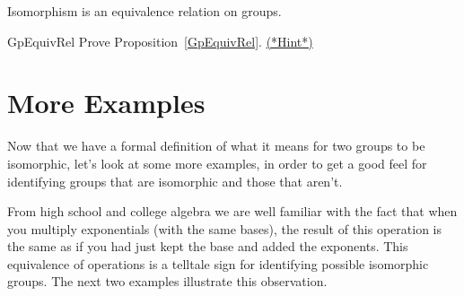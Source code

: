 \begin{thm}\label{GpEquivRel}
Isomorphism is an equivalence relation on groups. 
\end{thm}

\begin{exercise}{GpEquivRel}
Prove Proposition~\ref{GpEquivRel}.
\hyperref[sec:isomorph:hints]{(*Hint*)}
\end{exercise}

\section{More Examples}\label{iso_more_ex}

Now that we have a formal definition of what it means for two groups to be isomorphic, let's look at some more examples, in order to get a good feel for identifying groups that are isomorphic and those that aren't.



From high school and college algebra we are well familiar with the fact that when you multiply exponentials (with the same bases), the result of this operation is the same as if you had just kept the base and added the exponents.  This equivalence of operations is a telltale sign for identifying possible isomorphic groups.  The next two examples illustrate this observation.

